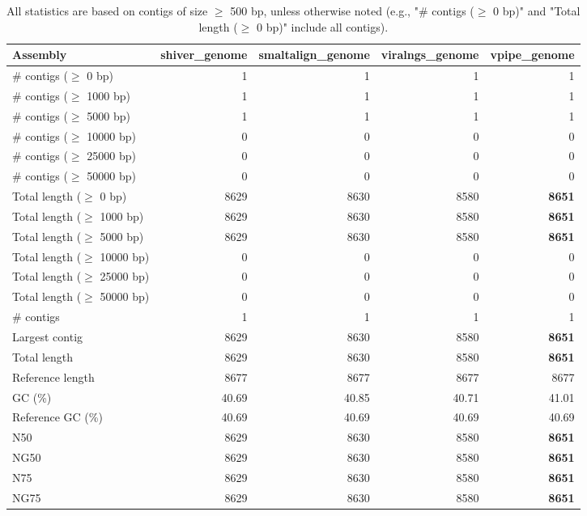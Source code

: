 \documentclass[12pt,a4paper]{article}
\begin{document}
\begin{table}[ht]
\begin{center}
\caption{All statistics are based on contigs of size $\geq$ 500 bp, unless otherwise noted (e.g., "\# contigs ($\geq$ 0 bp)" and "Total length ($\geq$ 0 bp)" include all contigs).}
\begin{tabular}{|l*{4}{|r}|}
\hline
Assembly & shiver\_genome & smaltalign\_genome & viralngs\_genome & vpipe\_genome \\ \hline
\# contigs ($\geq$ 0 bp) & 1 & 1 & 1 & 1 \\ \hline
\# contigs ($\geq$ 1000 bp) & 1 & 1 & 1 & 1 \\ \hline
\# contigs ($\geq$ 5000 bp) & 1 & 1 & 1 & 1 \\ \hline
\# contigs ($\geq$ 10000 bp) & 0 & 0 & 0 & 0 \\ \hline
\# contigs ($\geq$ 25000 bp) & 0 & 0 & 0 & 0 \\ \hline
\# contigs ($\geq$ 50000 bp) & 0 & 0 & 0 & 0 \\ \hline
Total length ($\geq$ 0 bp) & 8629 & 8630 & 8580 & {\bf 8651} \\ \hline
Total length ($\geq$ 1000 bp) & 8629 & 8630 & 8580 & {\bf 8651} \\ \hline
Total length ($\geq$ 5000 bp) & 8629 & 8630 & 8580 & {\bf 8651} \\ \hline
Total length ($\geq$ 10000 bp) & 0 & 0 & 0 & 0 \\ \hline
Total length ($\geq$ 25000 bp) & 0 & 0 & 0 & 0 \\ \hline
Total length ($\geq$ 50000 bp) & 0 & 0 & 0 & 0 \\ \hline
\# contigs & 1 & 1 & 1 & 1 \\ \hline
Largest contig & 8629 & 8630 & 8580 & {\bf 8651} \\ \hline
Total length & 8629 & 8630 & 8580 & {\bf 8651} \\ \hline
Reference length & 8677 & 8677 & 8677 & 8677 \\ \hline
GC (\%) & 40.69 & 40.85 & 40.71 & 41.01 \\ \hline
Reference GC (\%) & 40.69 & 40.69 & 40.69 & 40.69 \\ \hline
N50 & 8629 & 8630 & 8580 & {\bf 8651} \\ \hline
NG50 & 8629 & 8630 & 8580 & {\bf 8651} \\ \hline
N75 & 8629 & 8630 & 8580 & {\bf 8651} \\ \hline
NG75 & 8629 & 8630 & 8580 & {\bf 8651} \\ \hline

\end{tabular}
\end{center}
\end{table}
\end{document}
